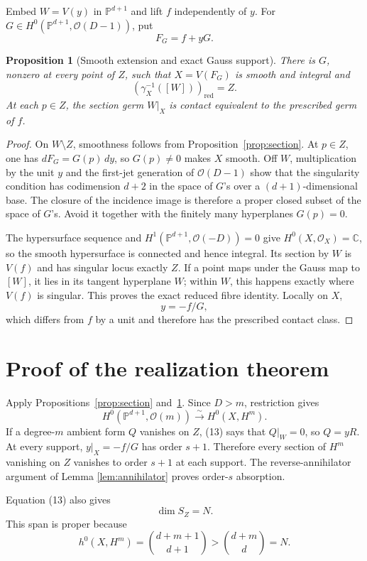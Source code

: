 \documentclass[11pt,a4paper]{article}
\newtheorem{proposition}[theorem]{Proposition}
\theoremstyle{definition}
\newcommand{\kk}{\mathbb C}
\newcommand{\PP}{\mathbb P}
\newcommand{\cO}{\mathcal O}
\begin{document}
Embed $W=V(y)$ in $\PP^{d+1}$ and lift $f$ independently of $y$.  For
$G\in H^0(\PP^{d+1},\cO(D-1))$, put
\[
 F_G=f+yG.
\]

\begin{proposition}[Smooth extension and exact Gauss support]\label{prop:extension}
There is $G$, nonzero at every point of $Z$, such that
$X=V(F_G)$ is smooth and integral and
\[
 (\gamma_X^{-1}([W]))_{\mathrm{red}}=Z.
\]
At each $p\in Z$, the section germ $W|_X$ is contact equivalent to the
prescribed germ of $f$.
\end{proposition}

\begin{proof}
On $W\setminus Z$, smoothness follows from Proposition~\ref{prop:section}.
At $p\in Z$, one has $dF_G=G(p)\,dy$, so $G(p)\ne0$ makes $X$ smooth.
Off $W$, multiplication by the unit $y$ and the first-jet generation of
$\cO(D-1)$ show that the singularity condition has codimension $d+2$ in the
space of $G$'s over a $(d+1)$-dimensional base.  The closure of the incidence
image is therefore a proper closed subset of the space of $G$'s.  Avoid it
together with the finitely many hyperplanes $G(p)=0$.

The hypersurface sequence and
$H^1(\PP^{d+1},\cO(-D))=0$ give $H^0(X,\cO_X)=\kk$, so the smooth
hypersurface is connected and hence integral.  Its section by $W$ is $V(f)$
and has singular locus exactly $Z$.  If a point maps under the
Gauss map to $[W]$, it lies in its tangent hyperplane $W$; within $W$, this
happens exactly where $V(f)$ is singular.  This proves the exact reduced
fibre identity.  Locally on $X$,
\[
 y=-f/G,
\]
which differs from $f$ by a unit and therefore has the prescribed contact
class.
\end{proof}

\section{Proof of the realization theorem}

Apply Propositions~\ref{prop:section} and~\ref{prop:extension}.  Since
$D>m$, restriction gives
\[
 H^0(\PP^{d+1},\cO(m))\xrightarrow{\sim}H^0(X,H^m).
\]
If a degree-$m$ ambient form $Q$ vanishes on $Z$, (13) says that
$Q|_W=0$, so $Q=yR$.  At every support, $y|_X=-f/G$ has order $s+1$.
Therefore every section of $H^m$ vanishing on $Z$ vanishes to order
$s+1$ at each support.  The reverse-annihilator argument of Lemma
\ref{lem:annihilator} proves order-$s$ absorption.

Equation (13) also gives
\[
 \dim S_Z=N.
\]
This span is proper because
\[
 h^0(X,H^m)=\binom{d+m+1}{d+1}>\binom{d+m}{d}=N.
\]
\end{document}
